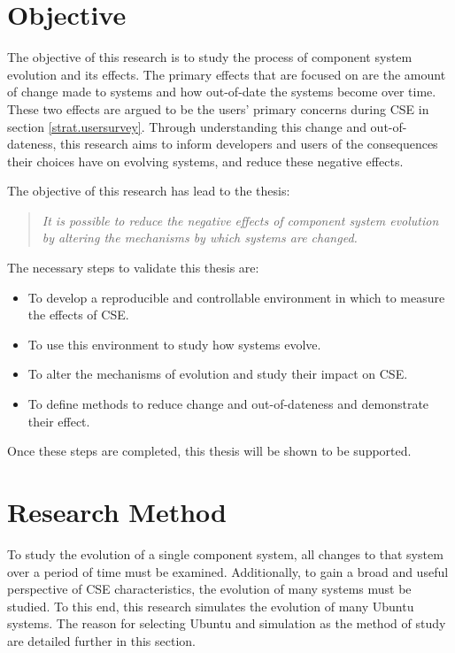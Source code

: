 \section{Objective}
The objective of this research is to study the process of component system evolution and its effects.
The primary effects that are focused on are the amount of change made to systems and how out-of-date the systems become over time.
These two effects are argued to be the users' primary concerns during CSE in section \ref{strat.usersurvey}.
Through understanding this change and out-of-dateness,
this research aims to inform developers and users of the consequences their choices have on evolving systems,
and reduce these negative effects.

The objective of this research has lead to the thesis:
\begin{quote}
\textit{It is possible to reduce the negative effects of component system evolution by altering the mechanisms by which systems are changed.} 
\end{quote}

The necessary steps to validate this thesis are:
\begin{itemize}
  \item To develop a reproducible and controllable environment in which to measure the effects of CSE.
  \item To use this environment to study how systems evolve.
  \item To alter the mechanisms of evolution and study their impact on CSE.
  \item To define methods to reduce change and out-of-dateness and demonstrate their effect.
\end{itemize}

Once these steps are completed, this thesis will be shown to be supported.  

\section{Research Method}
To study the evolution of a single component system, all changes to that system over a period of time must be examined.
Additionally, to gain a broad and useful perspective of CSE characteristics, the evolution of many systems must be studied.
To this end, this research simulates the evolution of many Ubuntu systems.
The reason for selecting Ubuntu and simulation as the method of study are detailed further in this section.

